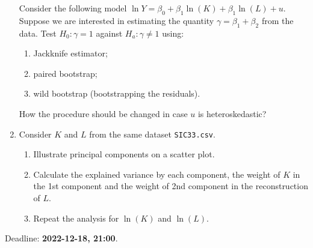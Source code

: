 \documentclass[12pt]{article}
\begin{document}
\begin{enumerate}
	Consider the following model $\ln Y = \beta_0 + \beta_1 \ln (K) + \beta_1 \ln (L)  + u$. 
	Suppose we are interested in estimating the quantity $\gamma =  \beta_1 +\beta_2 $ from the data. 
	Test $H_0 : \gamma = 1$ against $H_a : \gamma \neq 1$ using:
	
	
	\begin{enumerate}
		\item Jackknife estimator;
		\item paired bootstrap;
		\item wild bootstrap (bootstrapping the residuals).
		
	\end{enumerate}
	
	How  the procedure should be  changed in case $u$ is heteroskedastic? 
	
	
	\item  Consider $K$ and $L$  from the same dataset \texttt{SIC33.csv}. 
	
	
	\begin{enumerate}
		\item Illustrate principal  components on a scatter plot. 
		\item Calculate the explained variance by each component,  the weight of $K$ in the 1st component and  the weight of 2nd component in the reconstruction of $L$.
		\item Repeat the analysis for $\ln (K)$ and $\ln (L)$. 
	\end{enumerate}
	
	
	


\end{enumerate}






Deadline: \textbf{2022-12-18, 21:00}. 
\end{document}
